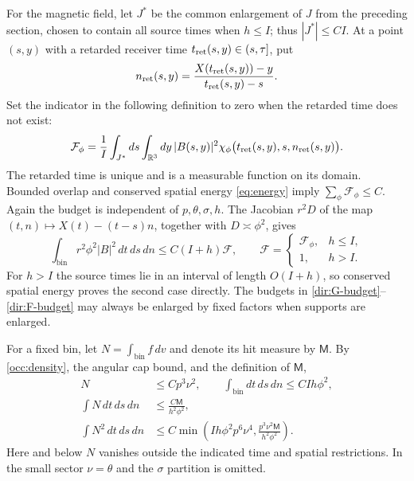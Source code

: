 For the magnetic field, let $J^*$ be the common enlargement of $J$
from the preceding section, chosen to contain all source times when
$h\le I$; thus $|J^*|\le CI$.  At a point $(s,y)$ with a retarded
receiver time $t_{\rm ret}(s,y)\in(s,\tau]$, put
\[
 n_{\rm ret}(s,y)
 =\frac{X(t_{\rm ret}(s,y))-y}{t_{\rm ret}(s,y)-s}.
\]
Set the indicator in the following definition to zero when the
retarded time does not exist:
\begin{equation}\label{dir:F-budget}
 \mathcal F_\phi
 =\frac1I\int_{J^*}ds\int_{\mathbb R^3}dy\,|B(s,y)|^2
    \chi_\phi\bigl(t_{\rm ret}(s,y),s,n_{\rm ret}(s,y)\bigr).
\end{equation}
The retarded time is unique and is a measurable function on its domain.
Bounded overlap and conserved spatial energy \eqref{eq:energy} imply
$\sum_\phi\mathcal F_\phi\le C$.  Again the budget is independent of
$p,\theta,\sigma,h$.  The Jacobian $r^2D$ of the map
$(t,n)\mapsto X(t)-(t-s)n$, together with $D\asymp\phi^2$, gives
\begin{equation}\label{dir:magnetic-budget}
 \int_{\mathrm{bin}} r^2\phi^2|B|^2\,dt\,ds\,dn
 \le C(I+h)\mathcal F,
 \qquad
 \mathcal F=
 \begin{cases}
  \mathcal F_\phi,&h\le I,\\
  1,&h>I.
 \end{cases}
\end{equation}
For $h>I$ the source times lie in an interval of length $O(I+h)$,
so conserved spatial energy proves the second case directly.
The budgets in \eqref{dir:G-budget}--\eqref{dir:F-budget} may always
be enlarged by fixed factors when supports are enlarged.

For a fixed bin, let $N=\int_{\mathrm{bin}}f\,dv$ and denote its hit
measure by $\mathsf M$.  By \eqref{occ:density}, the angular cap bound,
and the definition of $\mathsf M$,
\begin{equation}\label{dir:density-integrals}
 \begin{split}
 N&\le Cp^3\nu^2,\qquad
 \int_{\mathrm{bin}}dt\,ds\,dn\le CIh\phi^2,\\
 \int N\,dt\,ds\,dn&\le \frac{C\mathsf M}{h^2\phi^2},\\
 \int N^2\,dt\,ds\,dn
 &\le C\min\left(Ih\phi^2p^6\nu^4,
              \frac{p^3\nu^2\mathsf M}{h^2\phi^2}\right).
 \end{split}
\end{equation}
Here and below $N$ vanishes outside the indicated time and spatial
restrictions.  In the small sector $\nu=\theta$ and the $\sigma$
partition is omitted.

